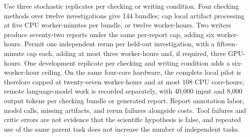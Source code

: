 Use three stochastic replicates per checking or writing condition. Four checking methods over twelve investigations give 144 bundles; cap local artifact processing at five CPU worker-minutes per bundle, or twelve worker-hours. Two writers produce seventy-two reports under the same per-report cap, adding six worker-hours. Permit one independent rerun per held-out investigation, with a fifteen-minute cap each, adding at most three worker-hours and, if required, three GPU-hours. One development replicate per checking and writing condition adds a six-worker-hour ceiling. On the same four-core hardware, the complete local pilot is therefore capped at twenty-seven worker-hours and at most 108 CPU core-hours; remote language-model work is recorded separately, with 40,000 input and 8,000 output tokens per checking bundle or generated report. Report annotation labor, model calls, missing artifacts, and rerun failures alongside costs. Tool failures and critic errors are not evidence that the scientific hypothesis is false, and repeated use of the same parent task does not increase the number of independent tasks.
